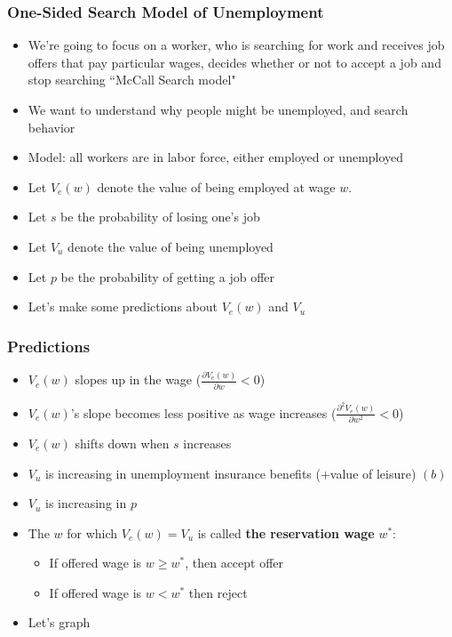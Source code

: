\documentclass{beamer}
\begin{document}
\begin{frame}
\frametitle[alignment=center]{One-Sided Search Model of Unemployment}
\begin{itemize}
\item We're going to focus on a worker, who is searching for work and receives job offers that pay particular wages, decides whether or not to accept a job and stop searching ``McCall Search model"
\bigskip
\item We want to understand why people might be unemployed, and search behavior
\bigskip
\item Model:  all workers are in labor force, either employed or unemployed
\bigskip
\item Let $V_e(w)$ denote the value of being employed at wage $w$.  
\item Let $s$ be the probability of losing one's job
\item Let $V_u$ denote the value of being unemployed
\item Let $p$ be the probability of getting a job offer
\item Let's make some predictions about $V_e(w)$ and $V_u$
\end{itemize}
\end{frame}

\begin{frame}
\frametitle[alignment=center]{Predictions}
\begin{itemize}
\item $V_e(w)$ slopes up in the wage ($\frac{\partial V_e(w)}{\partial w}<0$)
\smallskip
\item $V_e(w)$'s slope becomes less positive as wage increases ($\frac{\partial^2 V_e(w)}{\partial w^2}<0$)
\smallskip
\item $V_e(w)$ shifts down when $s$ increases
\smallskip
\item $V_u$  is increasing in unemployment insurance benefits (+value of leisure) $(b)$
\smallskip
\item $V_u$ is increasing in $p$ 
\smallskip
\item The $w$ for which $V_e(w)=V_u$ is called \textbf{the reservation wage} $w^*$:
\begin{itemize}
\item If offered wage is $w\geq w^*$, then accept offer
\item If offered wage is $w<w^*$ then reject
\end{itemize}
\item Let's graph
\end{itemize}
\end{frame}
\end{document}

